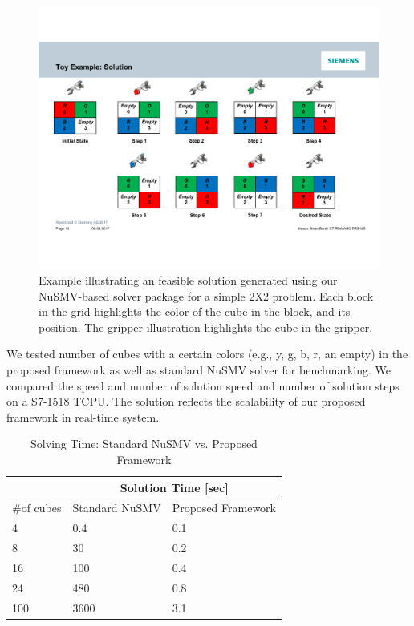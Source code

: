 \documentclass[3p,twocolumn,times,procedia]{elsarticle}
\begin{document}
\begin{figure}[t]
	\centering
	\includegraphics[width=\columnwidth]{planning_diagram.pdf} %
	\vspace{-0.1cm}
	\caption{Example illustrating an feasible solution generated using our NuSMV-based solver package for a simple 2X2 problem. Each block in the grid highlights the color of the cube in the block, and its position. The gripper illustration highlights the cube in the gripper.}
	\label{fig:example}
\end{figure}

We tested number of cubes with a certain colors (e.g., y, g, b, r, an empty) 
in the proposed framework as well as standard NuSMV solver for benchmarking. 
We compared the speed and number of solution speed and number of solution steps 
on a S7-1518 TCPU. The solution reflects the scalability of our proposed framework 
in real-time system. 

\begin{table}[b]
\centering
\caption{Solving Time: Standard NuSMV vs. Proposed Framework}
\label{my-label}
\begin{tabular}{|l|l|l|}
\hline
           & \multicolumn{2}{c|}{Solution Time {[}sec{]}} \\
           \hline
\#of cubes & Standard NuSMV       & Proposed Framework   \\
\hline
4          & 0.4                  & 0.1                  \\
\hline
8          & 30                   & 0.2                  \\
\hline
16         & 100                  & 0.4                  \\
\hline
24         & 480                  & 0.8                  \\
\hline
100        & 3600                 & 3.1                 \\
\hline
\end{tabular}
\end{table}
\end{document}

